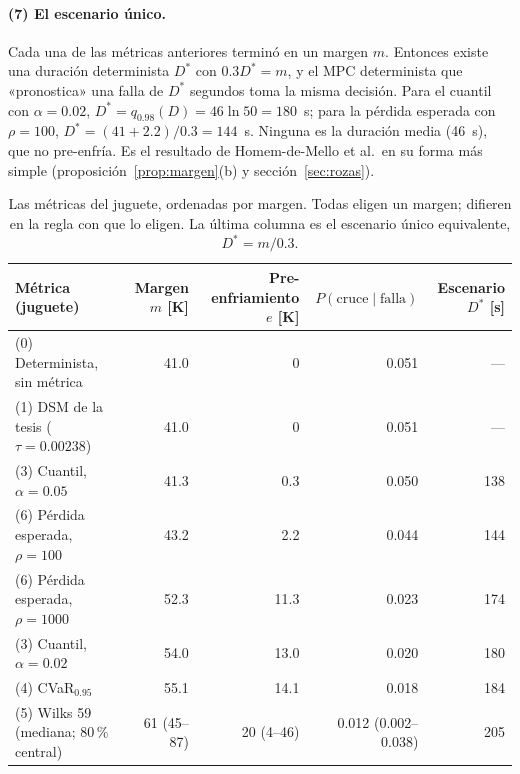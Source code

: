 \paragraph{(7) El escenario único.} Cada una de las métricas anteriores terminó en un margen
$m$. Entonces existe una duración determinista $D^*$ con $0.3D^*=m$, y el MPC determinista que
«pronostica» una falla de $D^*$ segundos toma la misma decisión. Para el cuantil con
$\alpha=0.02$, $D^*=q_{0.98}(D)=46\ln50=180$~s; para la pérdida esperada con $\rho=100$,
$D^*=(41+2.2)/0.3=144$~s. Ninguna es la duración media (46~s), que no pre-enfría. Es el resultado de
Homem-de-Mello et al.\ en su forma más simple (proposición~\ref{prop:margen}(b) y
sección~\ref{sec:rozas}).

\begin{table}[H]\centering\small
\begin{tabularx}{\linewidth}{@{}Y r r r r@{}}\toprule
Métrica (juguete) & Margen $m$ [K] & Pre-enfriamiento $e$ [K] & $P(\text{cruce}\mid\text{falla})$ & Escenario $D^*$ [s]\\\midrule
(0) Determinista, sin métrica & 41.0 & 0 & 0.051 & ---\\
(1) DSM de la tesis ($\tau=0.00238$) & 41.0 & 0 & 0.051 & ---\\
(3) Cuantil, $\alpha=0.05$ & 41.3 & 0.3 & 0.050 & 138\\
(6) Pérdida esperada, $\rho=100$ & 43.2 & 2.2 & 0.044 & 144\\
(6) Pérdida esperada, $\rho=1000$ & 52.3 & 11.3 & 0.023 & 174\\
(3) Cuantil, $\alpha=0.02$ & 54.0 & 13.0 & 0.020 & 180\\
(4) CVaR$_{0.95}$ & 55.1 & 14.1 & 0.018 & 184\\
(5) Wilks 59 (mediana; 80\,\% central) & 61 (45--87) & 20 (4--46) & 0.012 (0.002--0.038) & 205\\\bottomrule
\end{tabularx}
\caption{Las métricas del juguete, ordenadas por margen. Todas eligen un margen; difieren en la
regla con que lo eligen. La última columna es el escenario único equivalente, $D^*=m/0.3$.}
\label{tab:riesgo-juguete}
\end{table}

